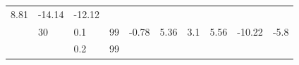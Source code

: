 \documentclass[12pt,oneside,a4paper]{reedthesis}
\begin{document}
\begin{longtable}[]{@{}llllllllll@{}}
\begin{minipage}[t]{0.07\columnwidth}
8.81\strut
\end{minipage} & \begin{minipage}[t]{0.09\columnwidth}\raggedright
-14.14\strut
\end{minipage} & \begin{minipage}[t]{0.09\columnwidth}\raggedright
-12.12\strut
\end{minipage}\tabularnewline
\begin{minipage}[t]{0.11\columnwidth}\raggedright
\strut
\end{minipage} & \begin{minipage}[t]{0.05\columnwidth}\raggedright
30\strut
\end{minipage} & \begin{minipage}[t]{0.05\columnwidth}\raggedright
0.1\strut
\end{minipage} & \begin{minipage}[t]{0.05\columnwidth}\raggedright
99\strut
\end{minipage} & \begin{minipage}[t]{0.07\columnwidth}\raggedright
-0.78\strut
\end{minipage} & \begin{minipage}[t]{0.07\columnwidth}\raggedright
5.36\strut
\end{minipage} & \begin{minipage}[t]{0.07\columnwidth}\raggedright
3.1\strut
\end{minipage} & \begin{minipage}[t]{0.07\columnwidth}\raggedright
5.56\strut
\end{minipage} & \begin{minipage}[t]{0.09\columnwidth}\raggedright
-10.22\strut
\end{minipage} & \begin{minipage}[t]{0.09\columnwidth}\raggedright
-5.8\strut
\end{minipage}\tabularnewline
\begin{minipage}[t]{0.11\columnwidth}\raggedright
\strut
\end{minipage} & \begin{minipage}[t]{0.05\columnwidth}\raggedright
\strut
\end{minipage} & \begin{minipage}[t]{0.05\columnwidth}\raggedright
0.2\strut
\end{minipage} & \begin{minipage}[t]{0.05\columnwidth}\raggedright
99\strut
\end{minipage} & \begin{minipage}[t]{0.07\columnwidth}\raggedright

\end{minipage}
\end{longtable}
\end{document}
